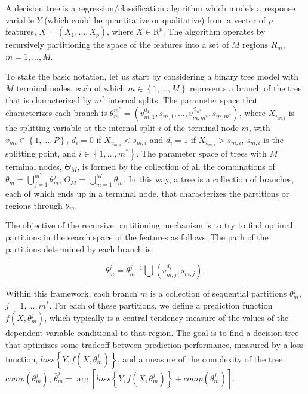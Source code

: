 \documentclass[]{elsarticle} %
\begin{document}
A decision tree is a regression/classification algorithm which models a
response variable \(Y\) (which could be quantitative or qualitative)
from a vector of \(p\) features, \(X=(X_{1},\dots,X_{p})\), where
\(X\in \mathrm{R}^{p}\). The algorithm operates by recursively
partitioning the space of the features into a set of \(M\) regions
\(R_{m}\), \(m=1,...,M\).

To state the basic notation, let us start by considering a binary tree
model with \(M\) terminal nodes, each of which
\(m\in \left\{ 1,...,M \right\}\) represents a branch of the tree that
is characterized by \(m^{\ast}\) internal splits. The parameter space
that characterizes each branch is
\(\theta_{m}^{m^{\ast }}=\left(v_{m,1}^{d_{1}},s_{m,1},...,v_{{m,m}^{\ast }}^{d_{m^{\ast }}},s_{{m,m}^{\ast}} \right)\),
where \(X_{v_{m,i}}\) is the splitting variable at the internal split
\(i\) of the terminal node \(m\), with
\(v_{mi}\in \left\{ 1,...,P \right\}\), \(d_{i}=0\) if
\(X_{v_{m,i}}<s_{m,i}\) and \(d_{i}=1\) if \(X_{v_{m,i}}>s_{m,i}\),
\(s_{m,i}\) is the splitting point, and
\(i\in \left\{ 1,...,m^{\ast } \right\}\). The parameter space of trees
with \(M\) terminal nodes, \(\Theta_{M}\), is formed by the collection
of all the combinations of
\(\theta_{m}=\bigcup\limits_{j=1}^{m^{\ast }}\theta_{m}^{j}\),
\(\Theta_{M}=\bigcup\limits_{m=1}^M \theta_{m}\). In this way, a tree is
a collection of branches, each of which ends up in a terminal node, that
characterizes the partitions or regions through \(\theta_{m}\).

The objective of the recursive partitioning mechanism is to try to find
optimal partitions in the search space of the features as follows. The
path of the partitions determined by each branch is:

\[
\theta_{m}^{j}=\theta_{m}^{j-1}\bigcup \left( v_{m,j}^{d_{j}},s_{m,j} \right) ,
\]

Within this framework, each branch \(m\) is a collection of sequential
partitions \(\theta_{m}^{j}\), \(j=1,\dots,m^{\ast }\). For each of
these partitions, we define a prediction function
\(f\left( X,\theta _{m}^{j} \right)\), which typically is a central
tendency measure of the values of the dependent variable conditional to
that region. The goal is to find a decision tree that optimizes some
tradeoff between prediction performance, measured by a loss function,
\(loss\left\{ Y,f\left( X,\theta_{m}^{j} \right) \right\}\), and a
measure of the complexity of the tree,
\(comp\left( \theta_{m}^{j} \right)\),
\(\hat{\theta}_{m}^{j}=\arg \left[ loss\left\{ Y,f\left( X,\theta_{m}^{j} \right)\right\}+comp\left( \theta_{m}^{j} \right) \right].\)
\end{document}
